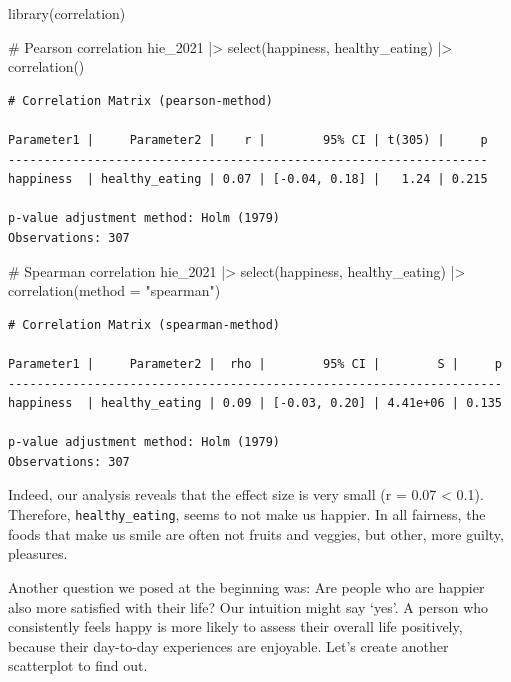 \documentclass[
  letterpaper,
  DIV=11,
  numbers=noendperiod]{scrreprt}
\newenvironment{Shaded}{\begin{snugshade}}{\end{snugshade}}
\newcommand{\AttributeTok}[1]{\textcolor[rgb]{0.40,0.45,0.13}{#1}}
\newcommand{\CommentTok}[1]{\textcolor[rgb]{0.37,0.37,0.37}{#1}}
\newcommand{\FunctionTok}[1]{\textcolor[rgb]{0.28,0.35,0.67}{#1}}
\newcommand{\NormalTok}[1]{\textcolor[rgb]{0.00,0.23,0.31}{#1}}
\newcommand{\SpecialCharTok}[1]{\textcolor[rgb]{0.37,0.37,0.37}{#1}}
\newcommand{\StringTok}[1]{\textcolor[rgb]{0.13,0.47,0.30}{#1}}
\begin{document}
\begin{Shaded}
\begin{Highlighting}[]
\FunctionTok{library}\NormalTok{(correlation)}

\CommentTok{\# Pearson correlation}
\NormalTok{hie\_2021 }\SpecialCharTok{|\textgreater{}}
  \FunctionTok{select}\NormalTok{(happiness, healthy\_eating) }\SpecialCharTok{|\textgreater{}}
  \FunctionTok{correlation}\NormalTok{()}
\end{Highlighting}
\end{Shaded}

\begin{verbatim}
# Correlation Matrix (pearson-method)

Parameter1 |     Parameter2 |    r |        95% CI | t(305) |     p
-------------------------------------------------------------------
happiness  | healthy_eating | 0.07 | [-0.04, 0.18] |   1.24 | 0.215

p-value adjustment method: Holm (1979)
Observations: 307
\end{verbatim}

\begin{Shaded}
\begin{Highlighting}[]
\CommentTok{\# Spearman correlation}
\NormalTok{hie\_2021 }\SpecialCharTok{|\textgreater{}}
  \FunctionTok{select}\NormalTok{(happiness, healthy\_eating) }\SpecialCharTok{|\textgreater{}}
  \FunctionTok{correlation}\NormalTok{(}\AttributeTok{method =} \StringTok{"spearman"}\NormalTok{)}
\end{Highlighting}
\end{Shaded}

\begin{verbatim}
# Correlation Matrix (spearman-method)

Parameter1 |     Parameter2 |  rho |        95% CI |        S |     p
---------------------------------------------------------------------
happiness  | healthy_eating | 0.09 | [-0.03, 0.20] | 4.41e+06 | 0.135

p-value adjustment method: Holm (1979)
Observations: 307
\end{verbatim}

Indeed, our analysis reveals that the effect size is very small (r =
0.07 \textless{} 0.1). Therefore, \texttt{healthy\_eating}, seems to not
make us happier. In all fairness, the foods that make us smile are often
not fruits and veggies, but other, more guilty, pleasures.

Another question we posed at the beginning was: Are people who are
happier also more satisfied with their life? Our intuition might say
`yes'. A person who consistently feels happy is more likely to assess
their overall life positively, because their day-to-day experiences are
enjoyable. Let's create another scatterplot to find out.
\end{document}

